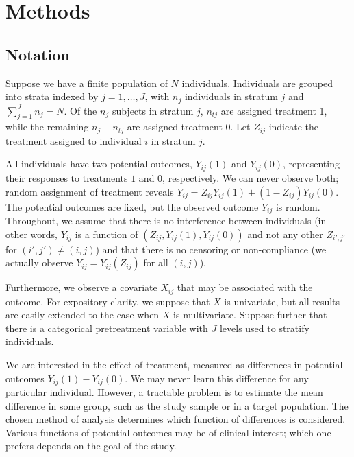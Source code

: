 \documentclass[12pt]{article}
\begin{document}
\section{Methods}\label{sec:methods}

\subsection{Notation}
Suppose we have a finite population of $N$ individuals.
Individuals are grouped into strata indexed by $j = 1, \dots, J$, with $n_j$ individuals in stratum $j$ and $\sum_{j=1}^J n_j = N$.
Of the $n_j$ subjects in stratum $j$, $n_{tj}$ are assigned treatment 1, while the remaining $n_j - n_{tj}$ are assigned treatment 0.
Let $Z_{ij}$ indicate the treatment assigned to individual $i$ in stratum $j$.

All individuals have two potential outcomes, $Y_{ij}(1)$ and $Y_{ij}(0)$, representing their responses to treatments $1$ and $0$, respectively.
We can never observe both; random assignment of treatment reveals $Y_{ij} = Z_{ij}Y_{ij}(1) + (1-Z_{ij})Y_{ij}(0)$.
The potential outcomes are fixed, but the observed outcome $Y_{ij}$ is random.
Throughout, we assume that there is no interference between individuals 
(in other words, $Y_{ij}$ is a function of $(Z_{ij}, Y_{ij}(1), Y_{ij}(0))$ and not any other $Z_{i', j'}$ for $(i', j') \neq (i, j)$)
and that there is no censoring or non-compliance
(we actually observe $Y_{ij} = Y_{ij}(Z_{ij})$ for all $(i, j)$).

Furthermore, we observe a covariate $X_{ij}$ that may be associated with the outcome.
For expository clarity, we suppose that $X$ is univariate, but all results are easily extended to the case when $X$ is multivariate.
Suppose further that there is a categorical pretreatment variable with $J$ levels used to stratify individuals. 

We are interested in the effect of treatment, measured as differences in potential outcomes $Y_{ij}(1) - Y_{ij}(0)$.
We may never learn this difference for any particular individual.
However, a tractable problem is to estimate the mean difference in some group, such as the study sample or in a target population.
The chosen method of analysis determines which function of differences is considered.
Various functions of potential outcomes may be of clinical interest; which one prefers depends on the goal of the study.
\end{document}

